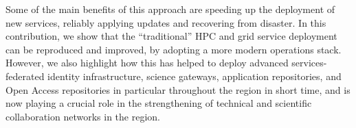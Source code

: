Some of the main benefits of this approach are speeding up the
deployment of new services, reliably applying updates and recovering
from disaster. In this contribution, we show that the ``traditional''
HPC and grid service deployment can be reproduced and improved, by
adopting a more modern operations stack. However, we also highlight how
this has helped to deploy advanced services- federated identity
infrastructure, science gateways, application repositories, and Open
Access repositories in particular throughout the region in short time,
and is now playing a crucial role in the strengthening of technical and
scientific collaboration networks in the region.
